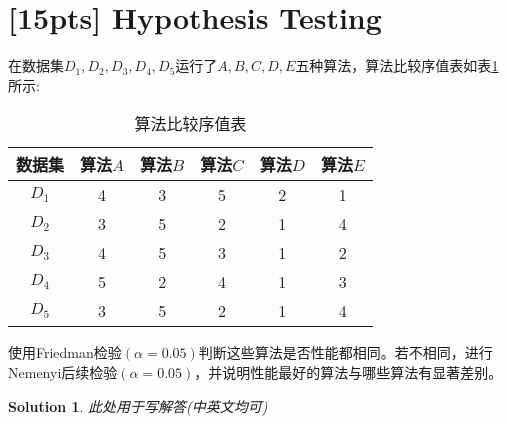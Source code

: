 \documentclass[a4paper,UTF8]{article}
\numberwithin{equation}{section}
\newtheorem*{mySol}{Solution}
\begin{document}
\section{[15pts] Hypothesis Testing} 
在数据集$D_1,D_2,D_3,D_4,D_5$运行了$A,B,C,D,E$五种算法，算法比较序值表如表\ref{table:ranking}所示:
\begin{table}[h]
\centering
\caption{算法比较序值表} \vspace{2mm}
\label{table:ranking}
\begin{tabular}{c|c c c c c}\hline
数据集 		& 算法$A$  	&算法$B$  	& 算法$C$ 	& 算法$D$  	&算法$E$ 	\\ \hline
$D_1$ 		& 4 		&  3  		& 5  		&  2 		& 1			\\
$D_2$ 		& 3 		&  5  		& 2  		&  1 		& 4			\\
$D_3$ 		& 4 		&  5  		& 3  		&  1 		& 2			\\ 
$D_4$ 		& 5 		&  2  		& 4  		&  1 		& 3			\\ 
$D_5$ 		& 3 		&  5  		& 2  		&  1 		& 4			\\ \hline
\end{tabular}
\end{table}

使用Friedman检验$(\alpha=0.05)$判断这些算法是否性能都相同。若不相同，进行Nemenyi后续检验$(\alpha=0.05)$，并说明性能最好的算法与哪些算法有显著差别。
\begin{mySol}
此处用于写解答(中英文均可)
~\\
~\\
~\\
\end{mySol}

\newpage
\end{document}
